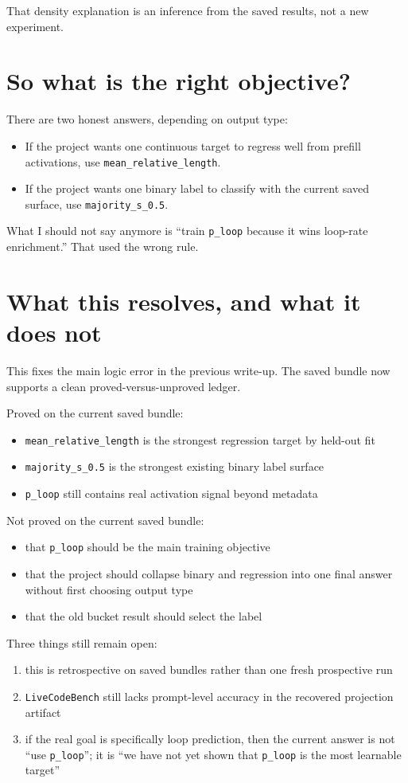 \documentclass[11pt]{article}
\begin{document}
That density explanation is an inference from the saved results, not a new
experiment.

\section*{So what is the right objective?}
There are two honest answers, depending on output type:
\begin{itemize}[leftmargin=1.5em]
\item If the project wants one continuous target to regress well from prefill
activations, use \texttt{mean\_relative\_length}.
\item If the project wants one binary label to classify with the current saved
surface, use \texttt{majority\_s\_0.5}.
\end{itemize}

What I should not say anymore is ``train \texttt{p\_loop} because it wins
loop-rate enrichment.'' That used the wrong rule.

\section*{What this resolves, and what it does not}
This fixes the main logic error in the previous write-up. The saved bundle now
supports a clean proved-versus-unproved ledger.

Proved on the current saved bundle:
\begin{itemize}[leftmargin=1.5em]
\item \texttt{mean\_relative\_length} is the strongest regression target by
held-out fit
\item \texttt{majority\_s\_0.5} is the strongest existing binary label surface
\item \texttt{p\_loop} still contains real activation signal beyond metadata
\end{itemize}

Not proved on the current saved bundle:
\begin{itemize}[leftmargin=1.5em]
\item that \texttt{p\_loop} should be the main training objective
\item that the project should collapse binary and regression into one final
answer without first choosing output type
\item that the old bucket result should select the label
\end{itemize}

Three things still remain open:
\begin{enumerate}[leftmargin=1.5em]
\item this is retrospective on saved bundles rather than one fresh prospective
run
\item \texttt{LiveCodeBench} still lacks prompt-level accuracy in the recovered
projection artifact
\item if the real goal is specifically loop prediction, then the current answer
is not ``use \texttt{p\_loop}''; it is ``we have not yet shown that
\texttt{p\_loop} is the most learnable target''
\end{enumerate}
\end{document}
